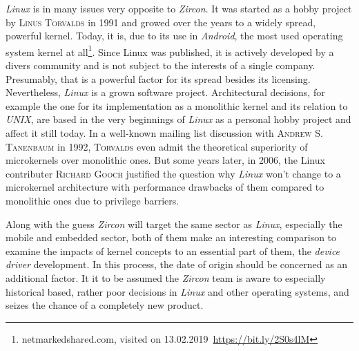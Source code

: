\textit{Linux} is in many issues very opposite to \textit{Zircon}.
It was started as a hobby project by \textsc{Linus Torvalds} in 1991 and growed over the years to a widely spread, powerful kernel.
Today, it is, due to its use in \textit{Android}, the most used operating system kernel at all\footnote{netmarkedshared.com, visited on 13.02.2019~\url{https://bit.ly/2S0s4lM}}. %
Since Linux was published, it is actively developed by a divers community and is not subject to the interests of a single company. 
Presumably, that is a powerful factor for its spread besides its licensing.
Nevertheless, \textit{Linux} is a grown software project.
Architectural decisions, for example the one for its implementation as a monolithic kernel and its relation to \textit{UNIX}, are based in the very beginnings of \textit{Linux} as a personal hobby project and affect it still today.
In a well-known mailing list discussion with \textsc{Andrew S. Tanenbaum} in 1992, \textsc{Torvalds} even admit the theoretical superiority of microkernels over monolithic ones\cite{linux-is-obsolete}.
But some years later, in 2006, the Linux contributer \textsc{Richard Gooch} justified the question why \textit{Linux} won't change to a microkernel architecture with performance drawbacks of them compared to monolithic ones due to privilege barriers\cite{why-linux-monolith}.

Along with the guess \textit{Zircon} will target the same sector as \textit{Linux}, especially the mobile and embedded sector, both of them make an interesting comparison to examine the impacts of kernel concepts to an essential part of them, the \textit{device driver} development.
In this process, the date of origin should be concerned as an additional factor.
It it to be assumed the \textit{Zircon} team is aware to especially historical based, rather poor decisions in \textit{Linux} and other operating systems, and seizes the chance of a completely new product.


